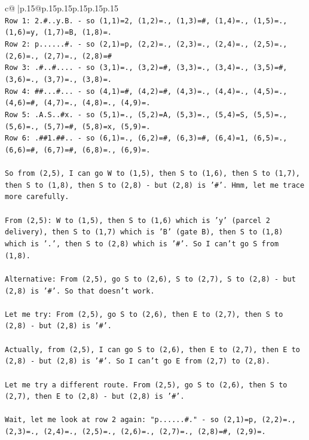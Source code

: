 \documentclass{article}
\begin{document}
{\begin{supertabular}{c@{$\;$}|p{.15\linewidth}@{}p{.15\linewidth}p{.15\linewidth}p{.15\linewidth}p{.15\linewidth}p{.15\linewidth}}
{{{\\ 
\texttt{Row 1: 2.\#..y.B. {-} so (1,1)=2, (1,2)=., (1,3)=\#, (1,4)=., (1,5)=., (1,6)=y, (1,7)=B, (1,8)=.} \\
\texttt{Row 2: p......\#. {-} so (2,1)=p, (2,2)=., (2,3)=., (2,4)=., (2,5)=., (2,6)=., (2,7)=., (2,8)=\#} \\
\texttt{Row 3: .\#..\#.... {-} so (3,1)=., (3,2)=\#, (3,3)=., (3,4)=., (3,5)=\#, (3,6)=., (3,7)=., (3,8)=.} \\
\texttt{Row 4: \#\#...\#... {-} so (4,1)=\#, (4,2)=\#, (4,3)=., (4,4)=., (4,5)=., (4,6)=\#, (4,7)=., (4,8)=., (4,9)=.} \\
\texttt{Row 5: .A.S..\#x. {-} so (5,1)=., (5,2)=A, (5,3)=., (5,4)=S, (5,5)=., (5,6)=., (5,7)=\#, (5,8)=x, (5,9)=.} \\
\texttt{Row 6: .\#\#1.\#\#.. {-} so (6,1)=., (6,2)=\#, (6,3)=\#, (6,4)=1, (6,5)=., (6,6)=\#, (6,7)=\#, (6,8)=., (6,9)=.} \\
\\ 
\texttt{So from (2,5), I can go W to (1,5), then S to (1,6), then S to (1,7), then S to (1,8), then S to (2,8) {-} but (2,8) is '\#'. Hmm, let me trace more carefully.} \\
\\ 
\texttt{From (2,5): W to (1,5), then S to (1,6) which is 'y' (parcel 2 delivery), then S to (1,7) which is 'B' (gate B), then S to (1,8) which is '.', then S to (2,8) which is '\#'. So I can't go S from (1,8).} \\
\\ 
\texttt{Alternative: From (2,5), go S to (2,6), S to (2,7), S to (2,8) {-} but (2,8) is '\#'. So that doesn't work.} \\
\\ 
\texttt{Let me try: From (2,5), go S to (2,6), then E to (2,7), then S to (2,8) {-} but (2,8) is '\#'. } \\
\\ 
\texttt{Actually, from (2,5), I can go S to (2,6), then E to (2,7), then E to (2,8) {-} but (2,8) is '\#'. So I can't go E from (2,7) to (2,8).} \\
\\ 
\texttt{Let me try a different route. From (2,5), go S to (2,6), then S to (2,7), then E to (2,8) {-} but (2,8) is '\#'. } \\
\\ 
\texttt{Wait, let me look at row 2 again: "p......\#." {-} so (2,1)=p, (2,2)=., (2,3)=., (2,4)=., (2,5)=., (2,6)=., (2,7)=., (2,8)=\#, (2,9)=.} \\
}}}
\end{supertabular}}
\end{document}
